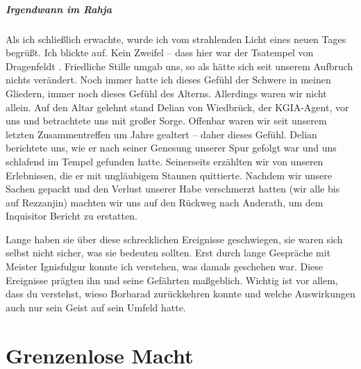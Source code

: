 \documentclass[11pt]{scrreprt}
\begin{document}
\paragraph{Irgendwann im Rahja}
Als ich schließlich erwachte, wurde ich vom strahlenden Licht eines neuen Tages begrüßt. Ich blickte auf. Kein Zweifel – dass hier war der Tsatempel von Dragenfeldt . Friedliche Stille umgab uns, so als hätte sich seit unserem Aufbruch nichts verändert. Noch immer hatte ich dieses Gefühl der Schwere in meinen Gliedern, immer noch dieses Gefühl des Alterns. Allerdings waren wir nicht allein. Auf den Altar gelehnt stand Delian von Wiedbrück, der KGIA-Agent, vor uns und betrachtete uns mit großer Sorge. Offenbar waren wir seit unserem letzten Zusammentreffen um Jahre gealtert – daher dieses Gefühl. Delian berichtete uns, wie er nach seiner Genesung unserer Spur gefolgt war und uns schlafend im Tempel gefunden hatte. Seinerseits erzählten wir von unseren Erlebnissen, die er mit ungläubigem Staunen quittierte. Nachdem wir unsere Sachen gepackt und den Verlust unserer Habe verschmerzt hatten (wir alle bis auf Rezzanjin) machten wir uns auf den Rückweg nach Anderath, um dem Inquisitor Bericht zu erstatten.\par

Lange haben sie über diese schrecklichen Ereignisse geschwiegen, sie waren sich selbst nicht sicher, was sie bedeuten sollten. Erst durch lange Gespräche mit Meister Ignisfulgur konnte ich verstehen, was damals geschehen war. Diese Ereignisse prägten ihn und seine Gefährten maßgeblich. Wichtig ist vor allem, dass du verstehst, wieso Borbarad zurückkehren konnte und welche Auswirkungen auch nur sein Geist auf sein Umfeld hatte.\par



\chapter{Grenzenlose Macht}
\end{document}
